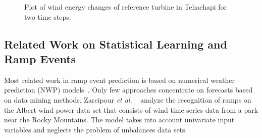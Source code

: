 \documentclass[10pt, conference, compsocconf]{IEEEtran}
\newcommand{\etal}{\emph{et al. }}
\begin{document}
\begin{figure}[thb]
\centering
{}
\caption{Plot of wind energy changes of reference turbine in Tehachapi for two time steps.}
\label{fig:ramps}
\end{figure}



\subsection{Related Work on Statistical Learning and Ramp Events}

Most related work in ramp event prediction is based on numerical weather prediction (NWP) models~\cite{greaves,focken}. %
Only few approaches concentrate on forecasts based on data mining methods. Zareipour \etal~\cite{svm_ramp} analyze the recognition of ramps on the Albert wind power data set that consists of wind time series data from a park near the Rocky Mountains. The model takes into account univariate input variables and neglects the problem of unbalances data sets.
\end{document}
